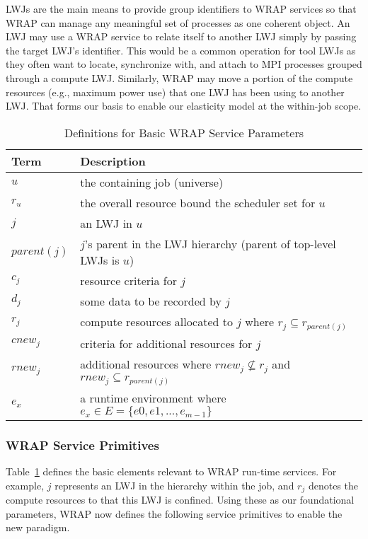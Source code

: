 LWJs are the main means to provide group identifiers to WRAP services
so that WRAP can manage any meaningful set of processes as one coherent object. 
An LWJ may use a WRAP service to relate itself 
to another LWJ simply by passing the target LWJ's identifier.
This would be a common operation for tool LWJs as they often want to 
locate, synchronize with, and attach to MPI processes grouped through a compute LWJ.
Similarly, WRAP may move a portion of the compute resources (e.g., maximum power use) 
that one LWJ has been using to another LWJ. That forms our basis to enable 
our elasticity model at the within-job scope.


\begin{table}
\centering
\begin{tabular}{|l|l|}
\hline
Term & Description \\
\hline
$u$ & the containing job (universe) \\
$r_u$ & the overall resource bound the scheduler set for $u$ \\
$j$ & an LWJ in $u$ \\
$parent(j)$ & $j$'s parent in the LWJ hierarchy (parent of top-level LWJs is $u$) \\
$c_j$ & resource criteria for $j$ \\
$d_j$ & some data to be recorded by $j$ \\
$r_j$ & compute resources allocated to $j$ where $r_j \subseteq r_{parent(j)}$ \\
$cnew_j$ & criteria for additional resources for $j$ \\
$rnew_j$ & additional resources where $rnew_j \not\subseteq r_j$ and $rnew_j \subseteq r_{parent(j)}$ \\
$e_x$ & a runtime environment where $e_x \in E = \{e0, e1, ..., e_{m-1}\}$ \\
\hline
\end{tabular}
\caption{Definitions for Basic WRAP Service Parameters}
\label{tab:def}
\end{table}

\subsubsection{WRAP Service Primitives}
\label{sect:prim}

Table~\ref{tab:def} defines the basic elements relevant to WRAP run-time services.
For example, $j$ represents an LWJ in the hierarchy within the job, and 
$r_j$ denotes the compute resources to that this LWJ is confined.
Using these as our foundational parameters, WRAP now defines
the following service primitives to enable the new paradigm.

